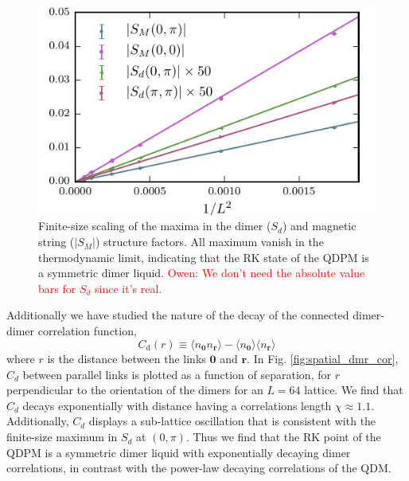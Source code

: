 \documentclass[twocolumn,prb,aps,floatfix,superscriptaddress]{revtex4-1}
\newcommand{\figref}[1]{Fig. \ref{#1}}
\newcommand{\note}[1]{\textcolor{red}{#1}}
\begin{document}
\begin{figure}[t]
    \centering
    \includegraphics[width=1.0\columnwidth]{peak_scaling.pdf}
    \caption{Finite-size scaling of the maxima in the dimer ($S_d$) and magnetic string ($|S_M|$) structure factors. All maximum vanish in the thermodynamic limit, indicating that the RK state of the QDPM is a symmetric dimer liquid. \note{Owen: We don't need the absolute value bars for $S_d$ since it's real.}}
    \label{fig:bragg_scaling}
\end{figure}

Additionally we have studied the nature of the decay of the connected dimer-dimer correlation function,
  \begin{equation}
    C_{\mathrm{d}} \left(r\right) \equiv \langle n_{\bm{0}} n_{\bm{r}} \rangle - \langle n_{\bm{0}} \rangle   \langle n_{\bm{r}} \rangle   
\end{equation}
where $r$ is the distance between the links $\bm{0}$ and $\bm{r}$. In \figref{fig:spatial_dmr_cor}, $C_d$ between parallel links is plotted as a function of separation, for $r$ perpendicular to the orientation of the dimers for an $L=64$ lattice. We find that $C_d$ decays exponentially with distance having a correlations length  $\chi\approx 1.1$. Additionally, $C_d$ displays a sub-lattice oscillation that is consistent with the finite-size maximum in $S_d$ at $(0,\pi)$. Thus we find that the RK point of the QDPM is a symmetric dimer liquid with exponentially decaying dimer correlations, in contrast with the power-law decaying correlations of the QDM.
\end{document}
